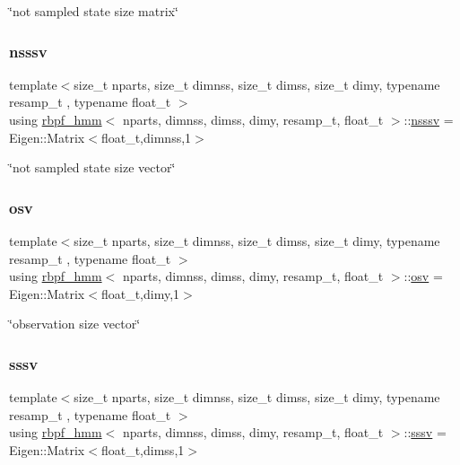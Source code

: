 \char`\"{}not sampled state size matrix\char`\"{} \mbox{\label{classrbpf__hmm_a7988465662f94f2ba45fd22566828d0f}} 
\subsubsection{\texorpdfstring{nsssv}{nsssv}}
{\footnotesize\ttfamily template$<$size\+\_\+t nparts, size\+\_\+t dimnss, size\+\_\+t dimss, size\+\_\+t dimy, typename resamp\+\_\+t , typename float\+\_\+t $>$ \\
using \hyperlink{classrbpf__hmm}{rbpf\+\_\+hmm}$<$ nparts, dimnss, dimss, dimy, resamp\+\_\+t, float\+\_\+t $>$\+::\hyperlink{classrbpf__hmm_a7988465662f94f2ba45fd22566828d0f}{nsssv} =  Eigen\+::\+Matrix$<$float\+\_\+t,dimnss,1$>$}

\char`\"{}not sampled state size vector\char`\"{} \mbox{\label{classrbpf__hmm_adafd37687fdd3bb776d3d33a5b0e7080}} 
\subsubsection{\texorpdfstring{osv}{osv}}
{\footnotesize\ttfamily template$<$size\+\_\+t nparts, size\+\_\+t dimnss, size\+\_\+t dimss, size\+\_\+t dimy, typename resamp\+\_\+t , typename float\+\_\+t $>$ \\
using \hyperlink{classrbpf__hmm}{rbpf\+\_\+hmm}$<$ nparts, dimnss, dimss, dimy, resamp\+\_\+t, float\+\_\+t $>$\+::\hyperlink{classrbpf__hmm_adafd37687fdd3bb776d3d33a5b0e7080}{osv} =  Eigen\+::\+Matrix$<$float\+\_\+t,dimy,1$>$}

\char`\"{}observation size vector\char`\"{} \mbox{\label{classrbpf__hmm_a28e8ad1d93bcf53cb74603f74826a81c}} 
\subsubsection{\texorpdfstring{sssv}{sssv}}
{\footnotesize\ttfamily template$<$size\+\_\+t nparts, size\+\_\+t dimnss, size\+\_\+t dimss, size\+\_\+t dimy, typename resamp\+\_\+t , typename float\+\_\+t $>$ \\
using \hyperlink{classrbpf__hmm}{rbpf\+\_\+hmm}$<$ nparts, dimnss, dimss, dimy, resamp\+\_\+t, float\+\_\+t $>$\+::\hyperlink{classrbpf__hmm_a28e8ad1d93bcf53cb74603f74826a81c}{sssv} =  Eigen\+::\+Matrix$<$float\+\_\+t,dimss,1$>$}

